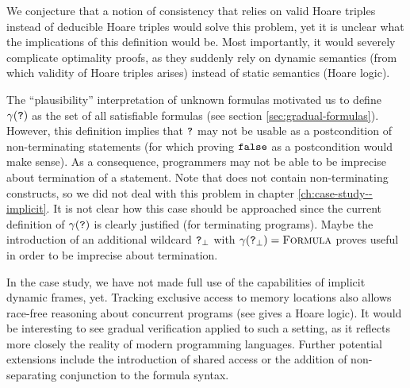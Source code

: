 We conjecture that a notion of consistency that relies on valid Hoare triples instead of deducible Hoare triples would solve this problem, yet it is unclear what the implications of this definition would be.
Most importantly, it would severely complicate optimality proofs, as they suddenly rely on dynamic semantics (from which validity of Hoare triples arises) instead of static semantics (Hoare logic).

The “plausibility” interpretation of unknown formulas motivated us to define $\gamma(\textup{\texttt{?}})$ as the set of all satisfiable formulas (see section \ref{sec:gradual-formulas}).
However, this definition implies that $\textup{\texttt{?}}$ may not be usable as a postcondition of non-terminating statements (for which proving $\textup{\texttt{false}}$ as a postcondition would make sense).
As a consequence, programmers may not be able to be imprecise about termination of a statement.
Note that \svlidf does not contain non-terminating constructs, so we did not deal with this problem in chapter \ref{ch:case-study--implicit}.
It is not clear how this case should be approached since the current definition of $\gamma(\textup{\texttt{?}})$ is clearly justified (for terminating programs).
Maybe the introduction of an additional wildcard $\textup{\texttt{?}}_{\bot}$ with $\gamma(\textup{\texttt{?}}_{\bot}) = \textup{\textsc{Formula}}$ proves useful in order to be imprecise about termination.

In the case study, we have not made full use of the capabilities of implicit dynamic frames, yet.
Tracking exclusive access to memory locations also allows race-free reasoning about concurrent programs (see \cite{summers2013formal} gives a Hoare logic).
It would be interesting to see gradual verification applied to such a setting, as it reflects more closely the reality of modern programming languages.
Further potential extensions include the introduction of shared access or the addition of non-separating conjunction to the formula syntax.


